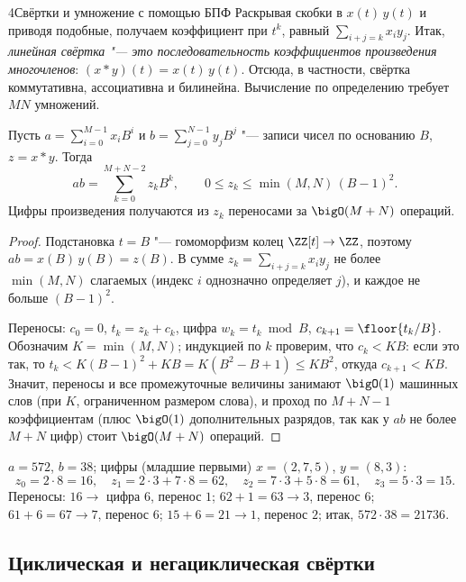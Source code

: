 \begin{lecture}{4}{Свёртки и умножение с помощью БПФ}
Раскрывая скобки в $x(t)\,y(t)$ и приводя подобные, получаем коэффициент при $t^k$, равный
$\sum_{i+j=k} x_i y_j$. Итак, \emph{линейная свёртка "--- это последовательность коэффициентов
произведения многочленов}: $(x * y)(t) = x(t)\,y(t)$. Отсюда, в частности, свёртка коммутативна,
ассоциативна и билинейна. Вычисление по определению требует $MN$ умножений.

\begin{proposition}\label{l4:intmul}
Пусть $a = \sum_{i=0}^{M-1} x_i B^i$ и $b = \sum_{j=0}^{N-1} y_j B^j$ "--- записи чисел по
основанию $B$, $z = x * y$. Тогда
\[
  ab = \sum_{k=0}^{M+N-2} z_k B^k, \qquad 0 \le z_k \le \min(M, N)\,(B - 1)^2 .
\]
Цифры произведения получаются из $z_k$ переносами за $\bigO(M + N)$ операций.
\end{proposition}

\begin{proof}
Подстановка $t = B$ "--- гомоморфизм колец $\ZZ[t] \to \ZZ$, поэтому
$ab = x(B)\,y(B) = z(B)$. В сумме $z_k = \sum_{i+j=k} x_i y_j$ не более $\min(M, N)$ слагаемых
(индекс $i$ однозначно определяет $j$), и каждое не больше $(B-1)^2$.

Переносы: $c_0 = 0$, $t_k = z_k + c_k$, цифра $w_k = t_k \bmod B$, $c_{k+1} = \floor{t_k / B}$.
Обозначим $K = \min(M, N)$; индукцией по $k$ проверим, что $c_k < KB$: если это так, то
$t_k < K(B-1)^2 + KB = K(B^2 - B + 1) \le KB^2$, откуда $c_{k+1} < KB$. Значит, переносы и все
промежуточные величины занимают $\bigO(1)$ машинных слов (при $K$, ограниченном размером слова),
и проход по $M + N - 1$ коэффициентам (плюс $\bigO(1)$ дополнительных разрядов, так как
у $ab$ не более $M + N$ цифр) стоит $\bigO(M + N)$ операций.
\end{proof}

\begin{example}\label{l4:conv-ex}
$a = 572$, $b = 38$; цифры (младшие первыми) $x = (2, 7, 5)$, $y = (8, 3)$:
\[
  z_0 = 2 \cdot 8 = 16, \quad z_1 = 2 \cdot 3 + 7 \cdot 8 = 62, \quad
  z_2 = 7 \cdot 3 + 5 \cdot 8 = 61, \quad z_3 = 5 \cdot 3 = 15.
\]
Переносы: $16 \to$ цифра $6$, перенос $1$; $62 + 1 = 63 \to 3$, перенос $6$; $61 + 6 = 67 \to 7$,
перенос $6$; $15 + 6 = 21 \to 1$, перенос $2$; итак, $572 \cdot 38 = 21736$.
\end{example}

\subsection{Циклическая и негациклическая свёртки}


\end{lecture}
